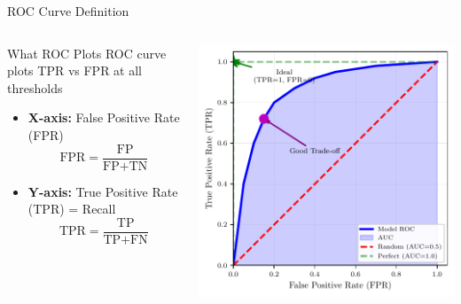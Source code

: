 \documentclass{beamer}
\begin{document}
\begin{frame}{ROC Curve Definition}
\begin{columns}
\begin{column}{0.48\textwidth}
\footnotesize
\begin{definitionbox}{What ROC Plots}
ROC curve plots TPR vs FPR at all thresholds

\vspace{0.15cm}

\begin{itemize}
    \item \textbf{X-axis:} False Positive Rate (FPR)
    $$\text{FPR} = \frac{\text{FP}}{\text{FP} + \text{TN}}$$

    \item \textbf{Y-axis:} True Positive Rate (TPR) = Recall
    $$\text{TPR} = \frac{\text{TP}}{\text{TP} + \text{FN}}$$
\end{itemize}
\end{definitionbox}
\end{column}
\begin{column}{0.48\textwidth}
\includegraphics[width=\textwidth]{roc-curve-diagram.pdf}
\end{column}
\end{columns}
\end{frame}
\end{document}
